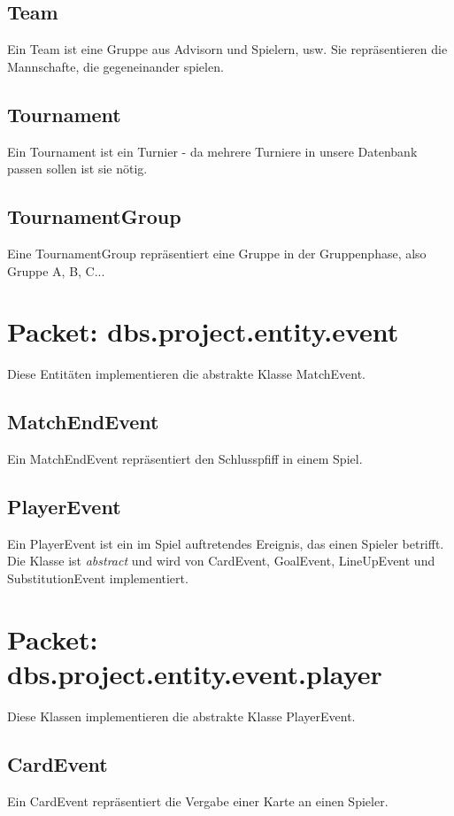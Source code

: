 \documentclass[11pt,german]{scrartcl}
\begin{document}
\subsection{Team}
Ein Team ist eine Gruppe aus Advisorn und Spielern, usw. Sie repräsentieren die Mannschafte, die gegeneinander spielen.

\subsection{Tournament}
Ein Tournament ist ein Turnier - da mehrere Turniere in unsere Datenbank passen sollen ist sie nötig.

\subsection{TournamentGroup}
Eine TournamentGroup repräsentiert eine Gruppe in der Gruppenphase, also Gruppe A, B, C...

\section{Packet: dbs.project.entity.event}
Diese Entitäten implementieren die abstrakte Klasse MatchEvent.

\subsection{MatchEndEvent}
Ein MatchEndEvent repräsentiert den Schlusspfiff in einem Spiel.

\subsection{PlayerEvent}
Ein PlayerEvent ist ein im Spiel auftretendes Ereignis, das einen Spieler betrifft. Die Klasse ist {\it abstract} und wird von CardEvent, GoalEvent, LineUpEvent und SubstitutionEvent implementiert.

\section{Packet: dbs.project.entity.event.player}
Diese Klassen implementieren die abstrakte Klasse PlayerEvent.

\subsection{CardEvent}
Ein CardEvent repräsentiert die Vergabe einer Karte an einen Spieler.
\end{document}
